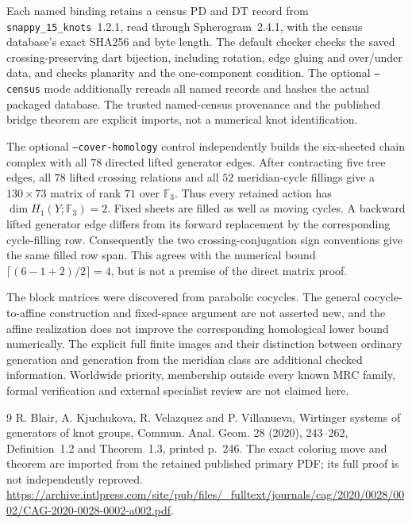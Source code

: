 \documentclass[11pt]{article}
\newcommand{\F}{\mathbb F}
\begin{document}
Each named binding retains a census PD and DT record from
\texttt{snappy\_15\_knots}~1.2.1, read through
Spherogram~2.4.1, with the census database's exact SHA256 and byte
length. The default checker checks the saved crossing-preserving
dart bijection, including rotation, edge gluing and over/under data,
and checks planarity and the one-component condition.
The optional \texttt{--census} mode additionally rereads all named
records and hashes the actual packaged database.
The trusted named-census provenance and the published bridge theorem
are explicit imports, not a numerical knot identification.

The optional \texttt{--cover-homology} control independently builds
the six-sheeted chain complex with all $78$ directed lifted generator
edges. After contracting five tree edges, all $78$ lifted crossing
relations and all $52$ meridian-cycle fillings give a $130\times73$
matrix of rank $71$ over $\F_3$. Thus every retained action has
$\dim H_1(Y;\F_3)=2$. Fixed sheets are filled as well as moving
cycles. A backward lifted generator edge differs from its forward
replacement by the corresponding cycle-filling row. Consequently
the two crossing-conjugation sign conventions give the same filled
row span. This agrees with the numerical bound
$\lceil(6-1+2)/2\rceil=4$, but is not a premise of the direct
matrix proof.

The block matrices were discovered from parabolic cocycles.
The general cocycle-to-affine construction and fixed-space argument
are not asserted new, and the affine realization does not improve
the corresponding homological lower bound numerically.
The explicit full finite images and their distinction between
ordinary generation and generation from the meridian class are
additional checked information. Worldwide priority, membership
outside every known MRC family, formal verification and external
specialist review are not claimed here.

\begin{thebibliography}{9}
R. Blair, A. Kjuchukova, R. Velazquez and P. Villanueva,
Wirtinger systems of generators of knot groups,
Commun. Anal. Geom. 28 (2020), 243--262,
Definition~1.2 and Theorem~1.3, printed p.~246.
The exact coloring move and theorem are imported from the retained
published primary PDF; its full proof is not independently reproved.
\url{https://archive.intlpress.com/site/pub/files/_fulltext/journals/cag/2020/0028/0002/CAG-2020-0028-0002-a002.pdf}.
\end{thebibliography}
\end{document}
